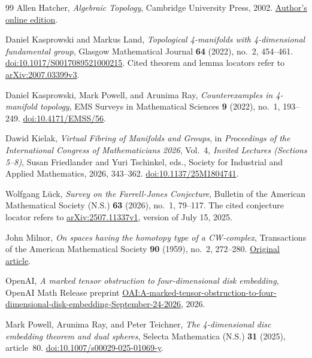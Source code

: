 \begin{thebibliography}{99}
Allen Hatcher,
\emph{Algebraic Topology},
Cambridge University Press, 2002.
\href{https://pi.math.cornell.edu/~hatcher/AT/ATpage.html}{Author's online edition}.

Daniel Kasprowski and Markus Land,
\emph{Topological 4-manifolds with 4-dimensional fundamental group},
Glasgow Mathematical Journal \textbf{64} (2022), no.~2, 454--461.
\href{https://doi.org/10.1017/S0017089521000215}{doi:10.1017/S0017089521000215}.
Cited theorem and lemma locators refer to
\href{https://arxiv.org/abs/2007.03399v3}{arXiv:2007.03399v3}.

Daniel Kasprowski, Mark Powell, and Arunima Ray,
\emph{Counterexamples in 4-manifold topology},
EMS Surveys in Mathematical Sciences \textbf{9} (2022), no.~1, 193--249.
\href{https://doi.org/10.4171/EMSS/56}{doi:10.4171/EMSS/56}.

Dawid Kielak,
\emph{Virtual Fibring of Manifolds and Groups},
in \emph{Proceedings of the International Congress of Mathematicians 2026},
Vol.~4, \emph{Invited Lectures (Sections 5--8)},
Susan Friedlander and Yuri Tschinkel, eds.,
Society for Industrial and Applied Mathematics, 2026, 343--362.
\href{https://doi.org/10.1137/25M1804741}{doi:10.1137/25M1804741}.

Wolfgang L\"uck,
\emph{Survey on the Farrell-Jones Conjecture},
Bulletin of the American Mathematical Society (N.S.) \textbf{63}
(2026), no.~1, 79--117.
The cited conjecture locator refers to
\href{https://arxiv.org/abs/2507.11337v1}{arXiv:2507.11337v1},
version of July 15, 2025.

John Milnor,
\emph{On spaces having the homotopy type of a CW-complex},
Transactions of the American Mathematical Society \textbf{90} (1959),
no.~2, 272--280.
\href{https://webhomes.maths.ed.ac.uk/~v1ranick/papers/milnorcw.pdf}{Original article}.

OpenAI,
\emph{A marked tensor obstruction to four-dimensional disk embedding},
OpenAI Math Release preprint
\href{https://github.com/openai/math/blob/main/preprints/A-marked-tensor-obstruction-to-four-dimensional-disk-embedding-September-24-2026/paper.pdf}{OAI:A-marked-tensor-obstruction-to-four-dimensional-disk-embedding-September-24-2026},
2026.

Mark Powell, Arunima Ray, and Peter Teichner,
\emph{The 4-dimensional disc embedding theorem and dual spheres},
Selecta Mathematica (N.S.) \textbf{31} (2025), article~80.
\href{https://doi.org/10.1007/s00029-025-01069-y}{doi:10.1007/s00029-025-01069-y}.


\end{thebibliography}
